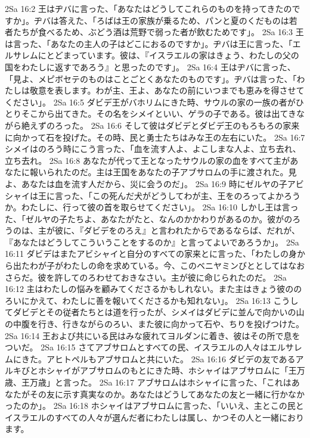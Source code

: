 2Sa 16:2  王はヂバに言った、「あなたはどうしてこれらのものを持ってきたのですか」。ヂバは答えた、「ろばは王の家族が乗るため、パンと夏のくだものは若者たちが食べるため、ぶどう酒は荒野で弱った者が飲むためです」。
2Sa 16:3  王は言った、「あなたの主人の子はどこにおるのですか」。ヂバは王に言った、「エルサレムにとどまっています。彼は、『イスラエルの家はきょう、わたしの父の国をわたしに返すであろう』と思ったのです」。
2Sa 16:4  王はヂバに言った、「見よ、メピボセテのものはことごとくあなたのものです」。ヂバは言った、「わたしは敬意を表します。わが主、王よ、あなたの前にいつまでも恵みを得させてください」。
2Sa 16:5  ダビデ王がバホリムにきた時、サウルの家の一族の者がひとりそこから出てきた。その名をシメイといい、ゲラの子である。彼は出てきながら絶えずのろった。
2Sa 16:6  そして彼はダビデとダビデ王のもろもろの家来に向かって石を投げた。その時、民と勇士たちはみな王の左右にいた。
2Sa 16:7  シメイはのろう時にこう言った、「血を流す人よ、よこしまな人よ、立ち去れ、立ち去れ。
2Sa 16:8  あなたが代って王となったサウルの家の血をすべて主があなたに報いられたのだ。主は王国をあなたの子アブサロムの手に渡された。見よ、あなたは血を流す人だから、災に会うのだ」。
2Sa 16:9  時にゼルヤの子アビシャイは王に言った、「この死んだ犬がどうしてわが主、王をのろってよかろうか。わたしに、行って彼の首を取らせてください」。
2Sa 16:10  しかし王は言った、「ゼルヤの子たちよ、あなたがたと、なんのかかわりがあるのか。彼がのろうのは、主が彼に、『ダビデをのろえ』と言われたからであるならば、だれが、『あなたはどうしてこういうことをするのか』と言ってよいであろうか」。
2Sa 16:11  ダビデはまたアビシャイと自分のすべての家来とに言った、「わたしの身から出たわが子がわたしの命を求めている。今、このベニヤミンびととしてはなおさらだ。彼を許してのろわせておきなさい。主が彼に命じられたのだ。
2Sa 16:12  主はわたしの悩みを顧みてくださるかもしれない。また主はきょう彼ののろいにかえて、わたしに善を報いてくださるかも知れない」。
2Sa 16:13  こうしてダビデとその従者たちとは道を行ったが、シメイはダビデに並んで向かいの山の中腹を行き、行きながらのろい、また彼に向かって石や、ちりを投げつけた。
2Sa 16:14  王および共にいる民はみな疲れてヨルダンに着き、彼はその所で息をついだ。
2Sa 16:15  さてアブサロムとすべての民、イスラエルの人々はエルサレムにきた。アヒトペルもアブサロムと共にいた。
2Sa 16:16  ダビデの友であるアルキびとホシャイがアブサロムのもとにきた時、ホシャイはアブサロムに「王万歳、王万歳」と言った。
2Sa 16:17  アブサロムはホシャイに言った、「これはあなたがその友に示す真実なのか。あなたはどうしてあなたの友と一緒に行かなかったのか」。
2Sa 16:18  ホシャイはアブサロムに言った、「いいえ、主とこの民とイスラエルのすべての人々が選んだ者にわたしは属し、かつその人と一緒におります。
